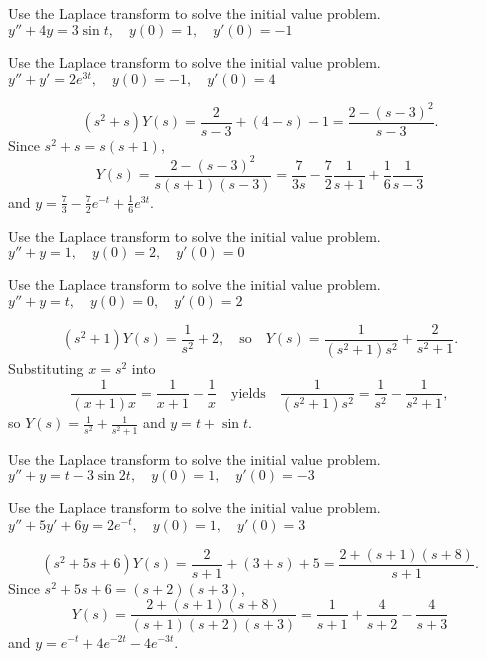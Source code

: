 \documentclass{ximera}
\begin{document}
\begin{problem}\label{exer:8.3.17} Use the Laplace transform to solve the initial value problem. $y''+4y=3\sin t, \quad  y(0)=1,\quad y'(0)=-1$
\end{problem}

\begin{problem}\label{exer:8.3.18} Use the Laplace transform to solve the initial value problem. $y''+y'=2e^{3t}, \quad  y(0)=-1,\quad y'(0)=4$

\begin{solution}
$$
(s^2+s)Y(s)=\frac{2}{s-3}+(4-s)-1=\frac{2-(s-3)^2}{s-3}.
$$
Since $s^2+s=s(s+1)$,
$$
Y(s)=\frac{2-(s-3)^2}{s(s+1)(s-3)}=\frac{7}{3s}-\frac{7}{2}\frac{1}{s+1}
+\frac{1}{6}\frac{1}{s-3}
$$
and $y=\frac{7}{3}-\frac{7}{2}e^{-t} +\frac{1}{6}e^{3t}$.
\end{solution}
\end{problem}

\begin{problem}\label{exer:8.3.19} Use the Laplace transform to solve the initial value problem. $y''+y=1, \quad  y(0)=2,\quad y'(0)=0$
\end{problem}

\begin{problem}\label{exer:8.3.20} Use the Laplace transform to solve the initial value problem. $y''+y=t, \quad  y(0)=0,\quad y'(0)=2$

\begin{solution}
$$
(s^2+1)Y(s)=\frac{1}{s^2}+2,\quad \mbox{so}\quad
Y(s)=\frac{1}{(s^2+1)s^2}+\frac{2}{s^2+1}.
$$
Substituting $x=s^2$ into
$$
\frac{1}{(x+1)x}=\frac{1}{x+1}-\frac{1}{x}
\quad \mbox{yields}\quad
\frac{1}{(s^2+1)s^2}=\frac{1}{s^2}-\frac{1}{s^2+1},
$$
so $Y(s)=\frac{1}{s^2}+\frac{1}{s^2+1}$ and $y=t+\sin t$.
\end{solution}
\end{problem}

\begin{problem}\label{exer:8.3.21} Use the Laplace transform to solve the initial value problem. $y''+y=t-3\sin2t, \quad  y(0)=1,\quad y'(0)=-3$
\end{problem}

\begin{problem}\label{exer:8.3.22} Use the Laplace transform to solve the initial value problem. $y''+5y'+6y=2e^{-t}, \quad  y(0)=1,\quad y'(0)=3$

\begin{solution}
$$
 (s^2+5s+6)Y(s)=\frac{2}{s+1}+(3+s)+5=\frac{2+(s+1)(s+8)}{s+1}.
$$
Since $s^2+5s+6=(s+2)(s+3)$,
$$
Y(s)=\frac{2+(s+1)(s+8)}{(s+1)(s+2)(s+3)}=
\frac{1}{s+1}+\frac{4}{s+2}-\frac{4}{s+3}
$$
and
 $y=e^{-t}+4e^{-2t}-4e^{-3t}$.
\end{solution}
\end{problem}
\end{document}
